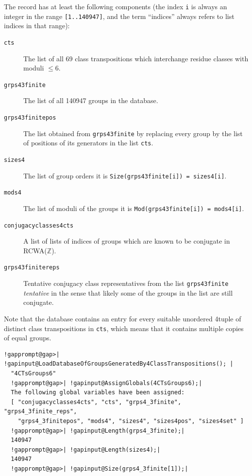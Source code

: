 \documentclass[a4paper,11pt]{report}
\begin{document}
{{{ The record has at least the following components (the index \texttt{i} is always an integer in the range \texttt{[1..140947]}, and the term ``indices'' always refers to list indices in that range): 
\begin{description}
\item[{\texttt{cts}}]  The list of all 69 class transpositions which interchange residue classes with
moduli $\leq 6$. 
\item[{\texttt{grps4{\textunderscore}3finite}}]  The list of all 140947 groups in the database. 
\item[{\texttt{grps4{\textunderscore}3finitepos}}]  The list obtained from \texttt{grps4{\textunderscore}3finite} by replacing every group by the list of positions of its generators in the
list \texttt{cts}. 
\item[{\texttt{sizes4}}]  The list of group orders \texttt{}\texttt{} it is \texttt{Size(grps4{\textunderscore}3finite[i]) = sizes4[i]}. 
\item[{\texttt{mods4}}]  The list of moduli of the groups \texttt{}\texttt{} it
is \texttt{Mod(grps4{\textunderscore}3finite[i]) = mods4[i]}. 
\item[{\texttt{conjugacyclasses4cts}}]  A list of lists of indices of groups which are known to be conjugate in
RCWA({\ensuremath{\mathbb Z}}). 
\item[{\texttt{grps4{\textunderscore}3finite{\textunderscore}reps}}]  Tentative conjugacy class representatives from the list \texttt{grps4{\textunderscore}3finite} \texttt{}\texttt{} \emph{tentative} in the sense that likely some of the groups in the list are still conjugate. 
\end{description}
 Note that the database contains an entry for every suitable unordered
4\texttt{}tuple of distinct class transpositions in \texttt{cts}, which means that it contains multiple copies of equal groups. 
\begin{Verbatim}[commandchars=!@|,fontsize=\small,frame=single,label=Example]
  !gapprompt@gap>| !gapinput@LoadDatabaseOfGroupsGeneratedBy4ClassTranspositions(); |
  "4CTsGroups6"
  !gapprompt@gap>| !gapinput@AssignGlobals(4CTsGroups6);|
  The following global variables have been assigned:
  [ "conjugacyclasses4cts", "cts", "grps4_3finite", "grps4_3finite_reps", 
    "grps4_3finitepos", "mods4", "sizes4", "sizes4pos", "sizes4set" ]
  !gapprompt@gap>| !gapinput@Length(grps4_3finite);|
  140947
  !gapprompt@gap>| !gapinput@Length(sizes4);|
  140947
  !gapprompt@gap>| !gapinput@Size(grps4_3finite[1]);|

\end{Verbatim}}}}
\end{document}
